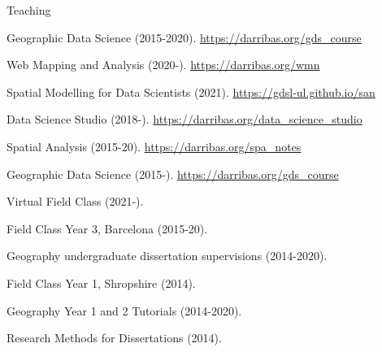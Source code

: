 \documentclass[12pt,2up]{article}
\begin{document}
\begin{cv}{}
\begin{cvlist}{Teaching}
\item[\textbf{Postgraduate}]

    \item Geographic Data Science (2015-2020).
        \url{https://darribas.org/gds_course}
    \item Web Mapping and Analysis (2020-). \url{https://darribas.org/wmn}
    \item Spatial Modelling for Data Scientists (2021).
        \url{https://gdsl-ul.github.io/san}
    \item Data Science Studio (2018-).
        \url{https://darribas.org/data_science_studio}
    \item Spatial Analysis (2015-20).
        \url{https://darribas.org/spa_notes}

\item[\textbf{Undergraduate}]
    \item Geographic Data Science (2015-). \url{https://darribas.org/gds_course}
    \item Virtual Field Class (2021-).
    \item Field Class Year 3, Barcelona (2015-20).
    \item Geography undergraduate dissertation supervisions (2014-2020).
    \item Field Class Year 1, Shropshire (2014).
    \item Geography Year 1 and 2 Tutorials (2014-2020).
    \item Research Methods for Dissertations (2014).




\end{cvlist}
\end{cv}
\end{document}
